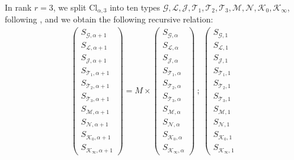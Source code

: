 \documentclass[11pt,english]{article}
\numberwithin{equation}{section}
\numberwithin{figure}{section}
\theoremstyle{definition}
\theoremstyle{plain}
\theoremstyle{remark}
\begin{document}
In rank $r=3$, we split $\mathrm{Cl}_{\alpha,3}$ into ten types
$\mathcal{G},\mathcal{L},\mathcal{J},\mathcal{T}_{1},\mathcal{T}_{2},\mathcal{T}_{3},\mathcal{M},\mathcal{N},\mathcal{K}_{0},\mathcal{K}_{\infty}$,
following \cite[\S 2.2.]{AKOV16}, and we obtain the following recursive
relation:\[
\begin{array}{l}
\left(
\begin{array}{c}
S_{\mathcal{G},\alpha+1} \\
S_{\mathcal{L},\alpha+1} \\
S_{\mathcal{J},\alpha+1} \\
S_{\mathcal{T}_{1},\alpha+1} \\
S_{\mathcal{T}_{2},\alpha+1} \\
S_{\mathcal{T}_{3},\alpha+1} \\
S_{\mathcal{M},\alpha+1} \\
S_{\mathcal{N},\alpha+1} \\
S_{\mathcal{K}_0,\alpha+1} \\
S_{\mathcal{K}_{\infty},\alpha+1}
\end{array}
\right)
=
M
\times
\left(
\begin{array}{c}
S_{\mathcal{G},\alpha} \\
S_{\mathcal{L},\alpha} \\
S_{\mathcal{J},\alpha} \\
S_{\mathcal{T}_{1},\alpha} \\
S_{\mathcal{T}_{2},\alpha} \\
S_{\mathcal{T}_{3},\alpha} \\
S_{\mathcal{M},\alpha} \\
S_{\mathcal{N},\alpha} \\
S_{\mathcal{K}_0,\alpha} \\
S_{\mathcal{K}_{\infty},\alpha}
\end{array}
\right)
\ ; \ 
\left(
\begin{array}{c}
S_{\mathcal{G},1} \\
S_{\mathcal{L},1} \\
S_{\mathcal{J},1} \\
S_{\mathcal{T}_{1},1} \\
S_{\mathcal{T}_{2},1} \\
S_{\mathcal{T}_{3},1} \\
S_{\mathcal{M},1} \\
S_{\mathcal{N},1} \\
S_{\mathcal{K}_0,1} \\
S_{\mathcal{K}_{\infty},1}
\end{array}

\end{array}\]
\end{document}
